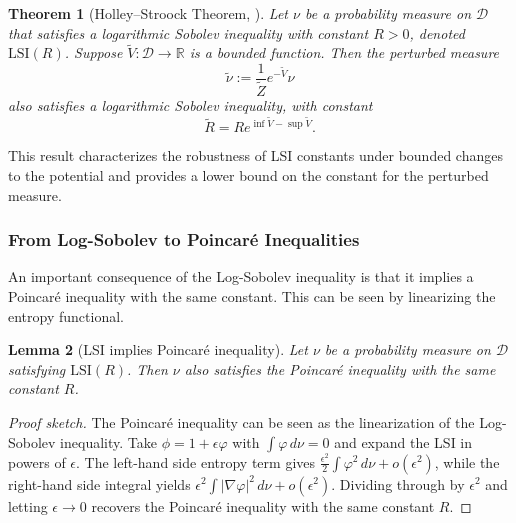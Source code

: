 \documentclass[11pt, twoside]{report}
\newtheorem{theorem}{Theorem}[section]
\newtheorem{lemma}[theorem]{Lemma}
\begin{document}
\begin{theorem}[Holley--Stroock Theorem, \cite{Holley1987}]
Let $\nu$ be a probability measure on $\mathcal{D}$ that satisfies a logarithmic Sobolev inequality with constant $R > 0$, denoted $\mathrm{LSI}(R)$. Suppose $\tilde{V}:\mathcal{D} \to \mathbb{R}$ is a bounded function. Then the perturbed measure
\[
\tilde{\nu} := \frac{1}{\tilde{Z}} e^{-\tilde{V}} \nu
\]
also satisfies a logarithmic Sobolev inequality, with constant
\[
\tilde{R} = R e^{\inf \tilde{V} - \sup \tilde{V}}.
\]
\end{theorem}

This result characterizes the robustness of LSI constants under bounded changes to the potential and provides a lower bound on the constant for the perturbed measure.


\subsubsection{From Log-Sobolev to Poincaré Inequalities}

An important consequence of the Log-Sobolev inequality is that it implies a Poincaré inequality with the same constant. This can be seen by linearizing the entropy functional.

\begin{lemma}[LSI implies Poincaré inequality]
Let $\nu$ be a probability measure on $\mathcal{D}$ satisfying $\mathrm{LSI}(R)$. Then $\nu$ also satisfies the Poincaré inequality with the same constant $R$.
\end{lemma}
\begin{proof}[Proof sketch]
The Poincaré inequality can be seen as the linearization of the Log-Sobolev inequality.  
Take $\phi = 1 + \epsilon \varphi$ with $\int \varphi\, d\nu = 0$ and expand the LSI in powers of $\epsilon$.  
The left-hand side entropy term gives $\tfrac{\epsilon^2}{2}\int \varphi^2\, d\nu + o(\epsilon^2)$, while the right-hand side integral yields $\epsilon^2 \int |\nabla \varphi|^2\, d\nu + o(\epsilon^2)$.  
Dividing through by $\epsilon^2$ and letting $\epsilon \to 0$ recovers the Poincaré inequality with the same constant $R$.
\end{proof}
\end{document}
